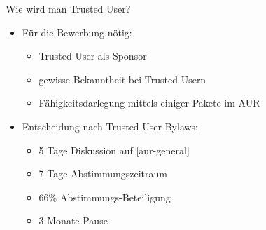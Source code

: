\begin{slide}{Wie wird man Trusted User?}
	\begin{itemize}
		\item{F\"{u}r die Bewerbung n\"{o}tig:
			\begin{itemize}
				\item{Trusted User als Sponsor}
				\item{gewisse Bekanntheit bei Trusted Usern}
				\item{F\"{a}higkeitsdarlegung mittels einiger Pakete im AUR}
			\end{itemize}
		}
		\item{Entscheidung nach Trusted User Bylaws:
			\begin{itemize}
				\item{5 Tage Diskussion auf [aur-general]}
				\item{7 Tage Abstimmungszeitraum}
				\item{66\% Abstimmungs-Beteiligung}
				\item{3 Monate Pause}
			\end{itemize}
		}
	\end{itemize}
\end{slide}

